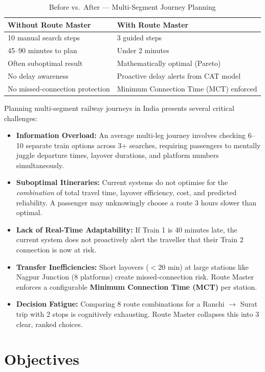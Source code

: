 \documentclass[12pt,a4paper]{report}
\begin{document}
\begin{table}[h!]
\centering
\caption{Before vs.\ After --- Multi-Segment Journey Planning}
\begin{tabularx}{\textwidth}{lX}
\toprule
\textbf{Without Route Master} & \textbf{With Route Master} \\
\midrule
10 manual search steps & 3 guided steps \\
45--90 minutes to plan & Under 2 minutes \\
Often suboptimal result & Mathematically optimal (Pareto) \\
No delay awareness & Proactive delay alerts from CAT model \\
No missed-connection protection & Minimum Connection Time (MCT) enforced \\
\bottomrule
\end{tabularx}
\end{table}

Planning multi-segment railway journeys in India presents several critical challenges:

\begin{itemize}[leftmargin=1.5em]
  \item \textbf{Information Overload:} An average multi-leg journey involves checking 6--10 separate train options across 3+ searches, requiring passengers to mentally juggle departure times, layover durations, and platform numbers simultaneously.
  \item \textbf{Suboptimal Itineraries:} Current systems do not optimise for the \textit{combination} of total travel time, layover efficiency, cost, and predicted reliability. A passenger may unknowingly choose a route 3 hours slower than optimal.
  \item \textbf{Lack of Real-Time Adaptability:} If Train 1 is 40 minutes late, the current system does not proactively alert the traveller that their Train 2 connection is now at risk.
  \item \textbf{Transfer Inefficiencies:} Short layovers ($<$20 min) at large stations like Nagpur Junction (8 platforms) create missed-connection risk. Route Master enforces a configurable \textbf{Minimum Connection Time (MCT)} per station.
  \item \textbf{Decision Fatigue:} Comparing 8 route combinations for a Ranchi $\to$ Surat trip with 2 stops is cognitively exhausting. Route Master collapses this into 3 clear, ranked choices.
\end{itemize}

\section{Objectives}
\end{document}
